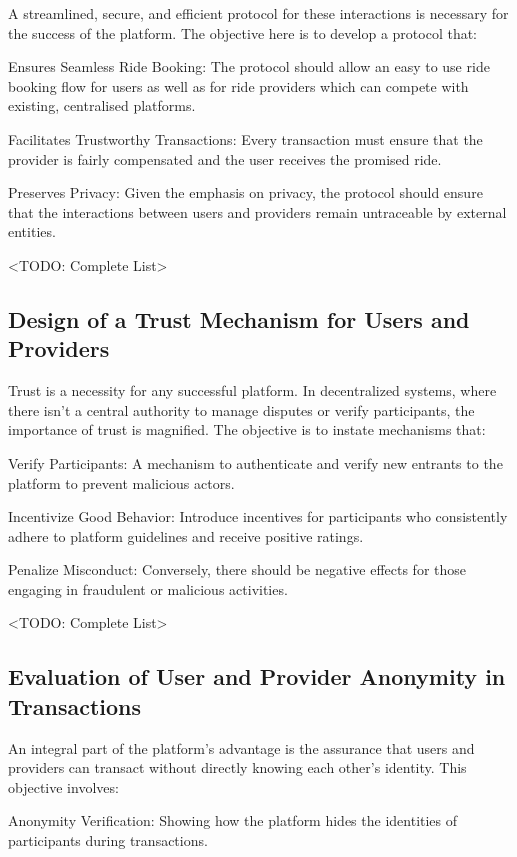 A streamlined, secure, and efficient protocol for these interactions is necessary for the success of the platform. The objective here is to develop a protocol that:

Ensures Seamless Ride Booking: The protocol should allow an easy to use ride booking flow for users as well as for ride providers which can compete with existing, centralised platforms.

Facilitates Trustworthy Transactions: Every transaction must ensure that the provider is fairly compensated and the user receives the promised ride.

Preserves Privacy: Given the emphasis on privacy, the protocol should ensure that the interactions between users and providers remain untraceable by external entities.

<TODO: Complete List>

\subsection{Design of a Trust Mechanism for Users and Providers}

Trust is a necessity for any successful platform. In decentralized systems, where there isn't a central authority to manage disputes or verify participants, the importance of trust is magnified. The objective is to instate mechanisms that:

Verify Participants: A mechanism to authenticate and verify new entrants to the platform to prevent malicious actors.

Incentivize Good Behavior: Introduce incentives for participants who consistently adhere to platform guidelines and receive positive ratings.

Penalize Misconduct: Conversely, there should be negative effects for those engaging in fraudulent or malicious activities.

<TODO: Complete List>

\subsection{Evaluation of User and Provider Anonymity in Transactions}

An integral part of the platform's advantage is the assurance that users and providers can transact without directly knowing each other's identity. This objective involves:

Anonymity Verification: Showing how the platform hides the identities of participants during transactions.

